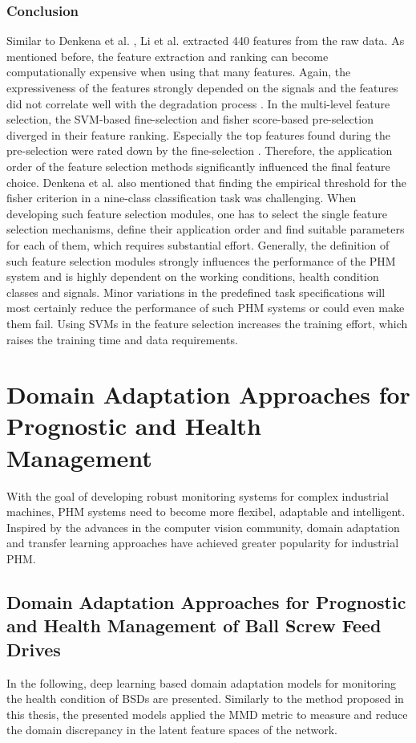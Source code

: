 \subsubsection{Conclusion}
Similar to Denkena et al. \cite{Denkena2021}, Li et al. \cite{LiPin2018} extracted 440 features from the raw data. As mentioned before, the feature extraction and ranking can become computationally expensive when using that many features. Again, the expressiveness of the features strongly depended on the signals and the features did not correlate well with the degradation process \cite{LiPin2018}. In the multi-level feature selection, the SVM-based fine-selection and fisher score-based pre-selection diverged in their feature ranking. Especially the top features found during the pre-selection were rated down by the fine-selection \cite{LiPin2018}. Therefore, the application order of the feature selection methods significantly influenced the final feature choice. Denkena et al. \cite{Denkena2021} also mentioned that finding the empirical threshold for the fisher criterion in a nine-class classification task was challenging. When developing such feature selection modules, one has to select the single feature selection mechanisms, define their application order and find suitable parameters for each of them, which requires substantial effort. Generally, the definition of such feature selection modules strongly influences the performance of the PHM system and is highly dependent on the working conditions, health condition classes and signals. Minor variations in the predefined task specifications will most certainly reduce the performance of such PHM systems or could even make them fail. Using SVMs in the feature selection increases the training effort, which raises the training time and data requirements.

\section{Domain Adaptation Approaches for Prognostic and Health Management} \label{sec:domain_adaption_approach}
With the goal of developing robust monitoring systems for complex industrial machines, PHM systems need to become more flexibel, adaptable and intelligent. Inspired by the advances in the computer vision community, domain adaptation and transfer learning approaches have achieved greater popularity for industrial PHM. 

\subsection{Domain Adaptation Approaches for Prognostic and Health Management of Ball Screw Feed Drives}
In the following, deep learning based domain adaptation models for monitoring the health condition of BSDs are presented. Similarly to the method proposed in this thesis, the presented models applied the MMD metric to measure and reduce the domain discrepancy in the latent feature spaces of the network.


